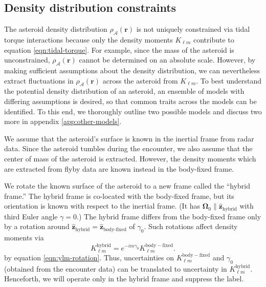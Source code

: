 \documentclass[fleqn,usenatbib]{mnras}
\newcommand{\unit}[1]{\bm{\hat{#1}}}
\begin{document}
\subsection{Density distribution constraints}
\label{sec:density-distro}

The asteroid density distribution $\rho_\mathcal{A}(\bm r)$ is not uniquely constrained via tidal torque interactions because only the density moments $K_{\ell m}$ contribute to equation \ref{eqn:tidal-torque}. For example, since the mass of the asteroid is unconstrained, $\rho_\mathcal{A}(\bm r)$ cannot be determined on an absolute scale. However, by making sufficient assumptions about the density distribution, we can nevertheless extract fluctuations in $\rho_\mathcal{A}(\bm r)$ across the asteroid from $K_{\ell m}$. To best understand the potential density distribution of an asteroid, an ensemble of models with differing assumptions is desired, so that common traits across the models can be identified. To this end, we thoroughly outline two possible models and discuss two more in appendix \ref{app:other-models}.

We assume that the asteroid's surface is known in the inertial frame from radar data. Since the asteroid tumbles during the encounter, we also assume that the center of mass of the asteroid is extracted.  However, the density moments which are extracted from flyby data are known instead in the body-fixed frame.

We rotate the known surface of the asteroid to a new frame called the ``hybrid frame.'' The hybrid frame is co-located with the body-fixed frame, but its orientation is known with respect to the inertial frame. (It has $\bm \Omega_0 \parallel \unit z_\text{hybrid}$ with third Euler angle $\gamma = 0$.) The hybrid frame differs from the body-fixed frame only by a rotation around $\unit z_\text{hybrid}=\unit z_\text{body-fixed}$ of $\gamma_0$. Such rotations affect density moments via 
\begin{equation}
  K_{\ell m}^\mathrm{hybrid} = e^{-im\gamma_0}K_{\ell m}^\mathrm{body-fixed}.
  \label{eqn:body-fixed-to-hybrid}
\end{equation}
by equation \ref{eqn:ylm-rotation}. Thus, uncertainties on $K_{\ell m}^\mathrm{body-fixed}$ and $\gamma_0$ (obtained from the encounter data) can be translated to uncertainty in $K_{\ell m}^\mathrm{hybrid}$. Henceforth, we will operate only in the hybrid frame and suppress the label.
\end{document}
